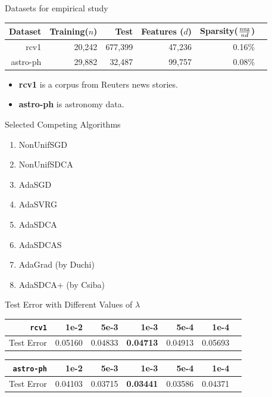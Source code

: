 \begin{frame}{Datasets for empirical study}
\begin{table}[htbp]
    \centering
    \begin{tabular}{|r|r|r|r|r|r}
        \hline
        Dataset & Training($n$) & Test & Features ($d$) & Sparsity($\frac{\operatorname*{nnz}}{nd}$) \\
        \hline
        rcv1      & 20,242 & 677,399 & 47,236 & 0.16\% \\
        \hline
        astro-ph       & 29,882  & 32,487    & 99,757 & 0.08\% \\
        \hline
    \end{tabular}
\end{table}
\begin{itemize}
\item \textbf{rcv1} is a corpus from Reuters news stories.
\item \textbf{astro-ph} is astronomy data.
\end{itemize}
\end{frame}

\begin{frame}{Selected Competing Algorithms}
            \begin{enumerate}
                \item NonUnifSGD
                \item NonUnifSDCA
                \item AdaSGD 
		\item AdaSVRG
                \item AdaSDCA
                \item AdaSDCAS
                \item AdaGrad (by Duchi)
                \item AdaSDCA+ (by Csiba)
            \end{enumerate}
\end{frame}

\begin{frame}{Test Error with Different Values of $\lambda$}
\begin{table}[htbp]
    \centering
    \begin{tabular}{|r|r|r|r|r|r|r|}
        \hline
        \texttt{rcv1} & 1e-2 & 5e-3 & \textbf{1e-3} & 5e-4 & 1e-4\\
        \hline
        Test Error & 0.05160 & 0.04833 & \textbf{0.04713} & 0.04913 & 0.05693 \\
        \hline
    \end{tabular}
    \begin{tabular}{|r|r|r|r|r|r|r|}
        \hline
         \texttt{astro-ph} & 1e-2 & 5e-3 & \textbf{1e-3} & 5e-4 & 1e-4 \\
        \hline
        Test Error & 0.04103 & 0.03715 & \textbf{0.03441} & 0.03586 & 0.04371 \\
        \hline
    \end{tabular}
\end{table}
\end{frame}

